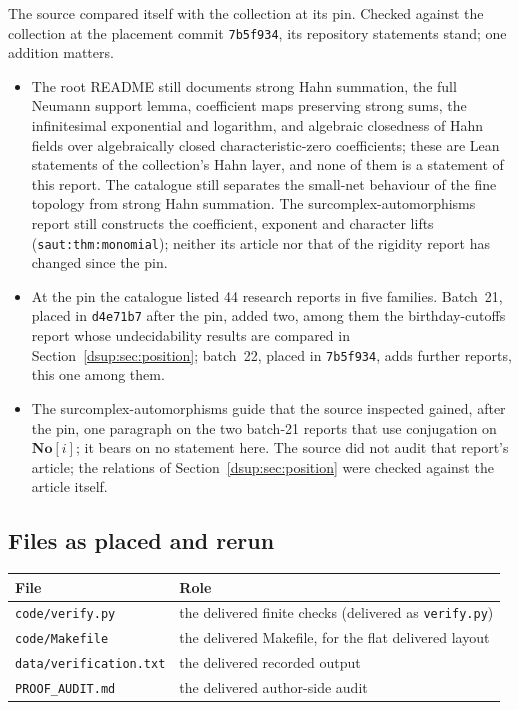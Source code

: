 \documentclass[11pt,oneside]{article}
\numberwithin{equation}{section}
\theoremstyle{definition}
\theoremstyle{remark}
\newcommand{\No}{\mathbf{No}}
\newcommand{\repo}[1]{\nolinkurl{#1}}%
\newcommand{\lbl}[1]{\nolinkurl{#1}}%
\begin{document}
The source compared itself with the collection at its pin. Checked against
the collection at the placement commit \texttt{7b5f934}, its repository
statements stand; one addition matters.
\begin{itemize}[leftmargin=*,itemsep=3pt]
\item The root README still documents strong Hahn summation, the full
Neumann support lemma, coefficient maps preserving strong sums, the
infinitesimal exponential and logarithm, and algebraic closedness of Hahn
fields over algebraically closed characteristic-zero coefficients; these
are Lean statements of the collection's Hahn layer, and none of them is a
statement of this report. The catalogue still separates the small-net
behaviour of the fine topology from strong Hahn summation. The
surcomplex-automorphisms report still constructs the coefficient, exponent
and character lifts (\lbl{saut:thm:monomial}); neither its article nor that
of the rigidity report has changed since the pin.
\item At the pin the catalogue listed 44 research reports in five families.
Batch~21, placed in \texttt{d4e71b7} after the pin, added two, among them
the birthday-cutoffs report whose undecidability results are compared in
Section~\ref{dsup:sec:position}; batch~22, placed in \texttt{7b5f934}, adds
further reports, this one among them.
\item The surcomplex-automorphisms guide that the source inspected gained,
after the pin, one paragraph on the two batch-21 reports that use
conjugation on $\No[i]$; it bears on no statement here. The source did not
audit that report's article; the relations of
Section~\ref{dsup:sec:position} were checked against the article itself.
\end{itemize}

\subsection{Files as placed and rerun}\label{dsup:app:files}

\begin{center}\small
\begin{tabular}{@{}ll@{}}
\toprule
File & Role \\
\midrule
\repo{code/verify.py} & the delivered finite checks (delivered as \texttt{verify.py})\\
\repo{code/Makefile} & the delivered Makefile, for the flat delivered layout\\
\repo{data/verification.txt} & the delivered recorded output\\
\repo{PROOF_AUDIT.md} & the delivered author-side audit\\
\bottomrule
\end{tabular}
\end{center}
\end{document}
